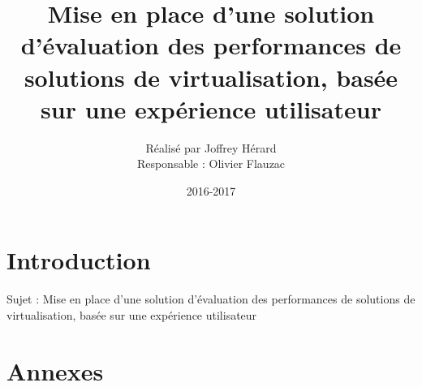 \documentclass[11pt]{article}
\begin{document}
 \makeatletter
\def\maketitle{%
  \null
  \thispagestyle{empty}%
  \vfill
  \begin{center}\leavevmode
    \normalfont
    {\Huge \@title\par}%
    \vskip 3cm
    {\Large \@author\par}%
    \vskip 1cm
    {\Large \@date\par}%
  \end{center}%
  \vfill
  \null
  \cleardoublepage
  }
\makeatother
\title{Mise en place d’une solution d'évaluation des performances de solutions de virtualisation, basée sur une expérience utilisateur}
\author{ Réalisé par Joffrey Hérard \begin{center}Responsable : Olivier Flauzac\end{center}}
\date{2016-2017}
\maketitle
 
\tableofcontents 

\newpage
\section{Introduction} 
Sujet : Mise en place d’une solution d'évaluation des performances de solutions de virtualisation, basée sur une expérience utilisateur




\section{Annexes}
\end{document}
